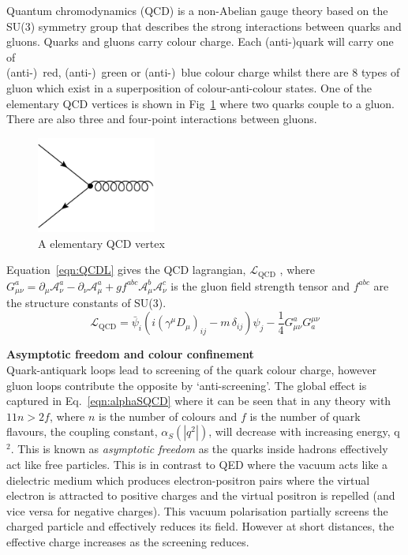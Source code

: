 Quantum chromodynamics (QCD) is a non-Abelian gauge theory based on the SU(3) symmetry group that describes the strong interactions between quarks and gluons. Quarks and gluons carry colour charge. Each (anti-)quark will carry one of \\(anti-)~red, (anti-)~green or (anti-)~blue colour charge whilst there are 8 types of gluon which exist in a superposition of colour-anti-colour states. One of the elementary QCD vertices is shown in Fig~\ref{fig:QCDvertex} where two quarks couple to a gluon. There are also three and four-point interactions between gluons.
\label{subsec:QCD}
\begin{figure}[ht!]
\begin{center}
    \includegraphics[width=0.35\textwidth]{images/Theory/QCDvertex.png}
    \caption{A elementary QCD vertex}
    \label{fig:QCDvertex}
\end{center}
\end{figure}


Equation~\ref{eqn:QCDL} gives the QCD lagrangian, $\mathcal{L}_{\textrm {QCD}}$ , where $G_{\mu \nu }^{a}=\partial _{\mu }{\mathcal {A}}_{\nu }^{a}-\partial _{\nu }{\mathcal {A}}_{\mu }^{a}+gf^{abc}{\mathcal {A}}_{\mu }^{b}{\mathcal {A}}_{\nu }^{c}$ is the gluon field strength tensor and $f^{abc}$ are the structure constants of SU(3).
\begin{equation}
    \label{eqn:QCDL}
{\mathcal {L}}_{\mathrm {QCD} }={\bar {\psi }}_{i}\left(i(\gamma ^{\mu }D_{\mu })_{ij}-m\,\delta _{ij}\right)\psi _{j}-{\frac {1}{4}}G_{\mu \nu }^{a}G_{a}^{\mu \nu }
\end{equation}

\textbf{Asymptotic freedom and colour confinement}\\
Quark-antiquark loops lead to screening of the quark colour charge, however gluon loops contribute the opposite by `anti-screening'. The global effect is captured in Eq.~\ref{eqn:alphaSQCD} where it can be seen that in any theory with $11n>2f$, where $n$ is the number of colours and $f$ is the number of quark flavours, the coupling constant, $\alpha_{S}\left( |q^{2}| \right)$, will decrease with increasing energy, q$^{2}$. This is known as \emph{asymptotic freedom} as the quarks inside hadrons effectively act like free particles. This is in contrast to QED where the vacuum acts like a dielectric medium which produces electron-positron pairs where the virtual electron is attracted to positive charges and the virtual positron is repelled (and vice versa for negative charges). This vacuum polarisation partially screens the charged particle and effectively reduces its field. However at short distances, the effective charge increases as the screening reduces.

